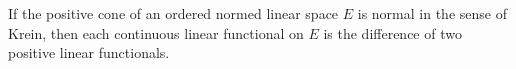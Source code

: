 If the positive cone of an ordered normed linear space $E$ is normal in the sense of Krein, then each continuous linear functional on $E$ is the difference of two positive linear functionals.
